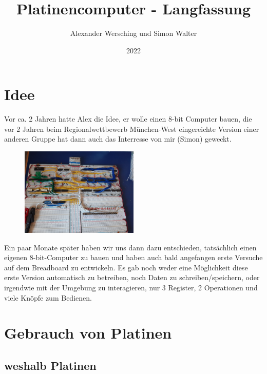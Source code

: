 \documentclass{scrartcl}
\begin{document}
    \title{Platinencomputer - Langfassung}
    \author{Alexander Wersching und Simon Walter}
    \date{2022}
    \maketitle

    \tableofcontents

    \newpage
    \section{Idee}


    Vor ca. 2 Jahren hatte Alex die Idee, er wolle einen 8-bit Computer bauen, die vor 2 Jahren beim Regionalwettbewerb München-West eingereichte Version einer anderen Gruppe hat dann auch das Interresse von mir (Simon) geweckt.
        \begin{figure}
        \vspace{-25pt}
        \begin{center}
            \includegraphics[width=0.5\textwidth]{Computer_V01_Overview_01}
        \end{center}
        \vspace{-20pt}
        \end{figure}
    Ein paar Monate später haben wir uns dann dazu entschieden, tatsächlich einen eigenen 8-bit-Computer zu bauen und haben auch bald angefangen erste Versuche auf dem Breadboard zu entwickeln.
    Es gab noch weder eine Möglichkeit diese erste Version automatisch zu betreiben, noch Daten zu schreiben/speichern, oder irgendwie mit der Umgebung zu interagieren, nur 3 Register, 2 Operationen und viele Knöpfe zum Bedienen.


    \section{Gebrauch von Platinen}
    \subsection{weshalb Platinen}
\end{document}
